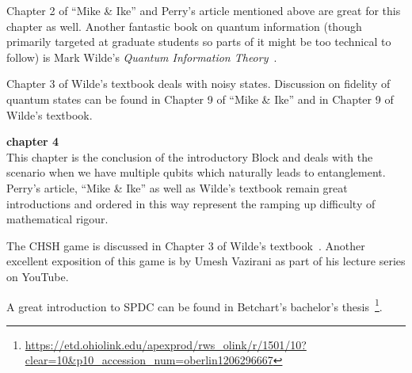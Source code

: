 Chapter 2 of “Mike \& Ike” and Perry’s article mentioned above are great for this chapter as well. Another fantastic book on quantum information (though primarily targeted at graduate students so parts of it might be too technical to follow) is Mark Wilde's \emph{Quantum Information Theory}~\cite{wilde2013quantum}.

Chapter 3 of Wilde’s textbook deals with noisy states. Discussion on fidelity of quantum states can be found in Chapter 9 of “Mike \& Ike” and in Chapter 9 of Wilde’s textbook.

{\bf chapter 4}\\

This chapter is the conclusion of the introductory Block and deals with the scenario when we have multiple qubits which naturally leads to entanglement. Perry’s article, “Mike \& Ike” as well as Wilde’s textbook remain great introductions and ordered in this way represent the ramping up difficulty of mathematical rigour. 

The CHSH game is discussed in Chapter 3 of Wilde’s textbook~\cite{wilde2013quantum}. Another excellent exposition of this game is by Umesh Vazirani as part of his lecture series on YouTube.

A great introduction to SPDC can be found in Betchart’s bachelor's thesis~\footnote{\url{https://etd.ohiolink.edu/apexprod/rws_olink/r/1501/10?clear=10&p10_accession_num=oberlin1206296667}}.

